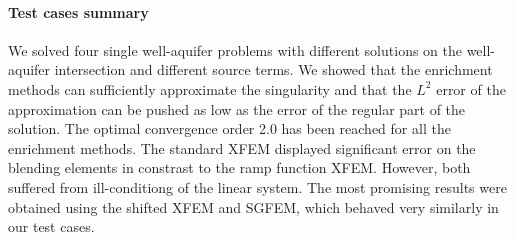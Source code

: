 
\paragraph{Test cases summary}
We solved four single well-aquifer problems with different solutions on the well-aquifer intersection and different source terms.
We showed that the enrichment methods can sufficiently approximate the singularity and that the $L^2$ error of the approximation
can be pushed as low as the error of the regular part of the solution. The optimal convergence order 2.0 has been reached for all
the enrichment methods. The standard XFEM displayed significant error on the blending elements in constrast to the ramp function XFEM.
However, both suffered from ill-conditiong of the linear system. The most promising results were obtained using the shifted XFEM
and SGFEM, which behaved very similarly in our test cases.

